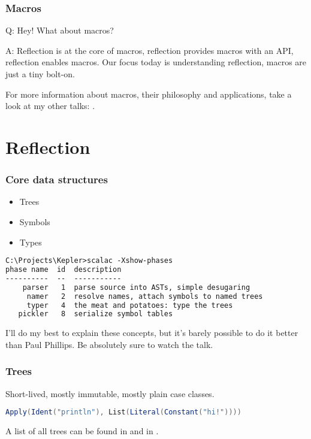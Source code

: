\documentclass[hyperref={bookmarks=false}]{beamer}
\begin{document}
\begin{frame}[fragile]
\frametitle{Macros}

Q: Hey! What about macros?

A: Reflection is at the core of macros, reflection provides macros with an API, reflection enables macros.
Our focus today is understanding reflection, macros are just a tiny bolt-on.

For more information about macros, their philosophy and applications, take a look at my other talks:
.

\end{frame}

\section{Reflection}

\begin{frame}[fragile]
\frametitle{Core data structures}

\begin{itemize}
\item Trees
\item Symbols
\item Types
\end{itemize}

\begin{lstlisting}[language=XML]
C:\Projects\Kepler>scalac -Xshow-phases
phase name  id  description
----------  --  -----------
    parser   1  parse source into ASTs, simple desugaring
     namer   2  resolve names, attach symbols to named trees
     typer   4  the meat and potatoes: type the trees
   pickler   8  serialize symbol tables
\end{lstlisting}

I'll do my best to explain these concepts, but it's barely possible to do it better than Paul Phillips.
Be absolutely sure to watch the  talk.
\end{frame}

\begin{frame}[fragile]
\frametitle{Trees}

Short-lived, mostly immutable, mostly plain case classes.

\begin{lstlisting}[language=Scala]
Apply(Ident("println"), List(Literal(Constant("hi!"))))
\end{lstlisting}

A list of all trees can be found in
and in .

\end{frame}
\end{document}

